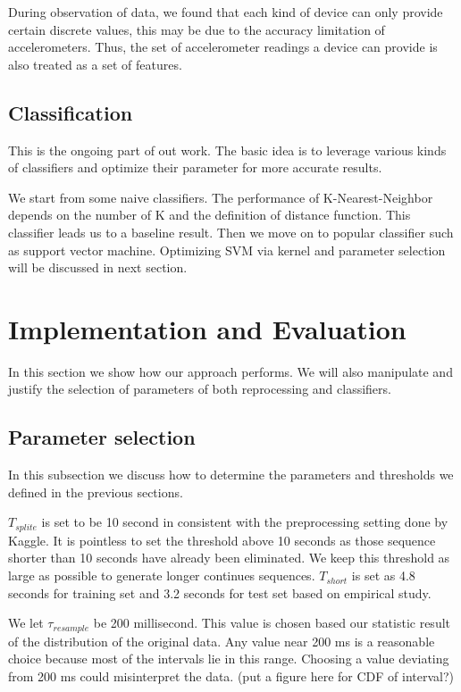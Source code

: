 \documentclass{article} %
\begin{document}
During observation of data, we found that each kind of device can only provide certain discrete values, this may be due to the accuracy limitation of accelerometers. Thus, the set of accelerometer readings a device can provide is also treated as a set of features.

\subsection{Classification}
This is the ongoing part of out work. The basic idea is to leverage various kinds of classifiers and optimize their parameter for more accurate results.

We start from some naive classifiers. The performance of K-Nearest-Neighbor depends on the number of K and the definition of distance function. This classifier leads us to a baseline result. Then we move on to popular classifier such as support vector machine. Optimizing SVM via kernel and parameter selection will be discussed in next section.

\section{Implementation and Evaluation}
In this section we show how our approach performs. We will also manipulate and justify the selection of parameters of both reprocessing and classifiers.

\subsection{Parameter selection}
In this subsection we discuss how to determine the parameters and thresholds we defined in the previous sections.

$T_{splite}$ is set to be 10 second in consistent with the preprocessing setting done by Kaggle. It is pointless to set the threshold above 10 seconds as those sequence shorter than 10 seconds have already been eliminated. We keep this threshold as large as possible to generate longer continues sequences. $T_{short}$ is set as 4.8 seconds for training set and 3.2 seconds for test set based on empirical study. 

We let $\tau_{resample}$ be 200 millisecond. This value is chosen based our statistic result of the distribution of the original data. Any value near 200 ms is a reasonable choice because most of the intervals lie in this range. Choosing a value deviating from 200 ms could misinterpret the data. (put a figure here for CDF of interval?)
\end{document}
